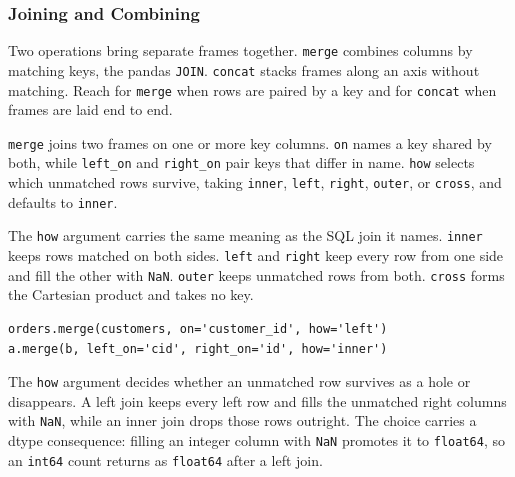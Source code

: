 \subsubsection{Joining and Combining}

Two operations bring separate frames together. \texttt{merge} combines columns by matching keys, the pandas \texttt{JOIN}. \texttt{concat} stacks frames along an axis without matching. Reach for \texttt{merge} when rows are paired by a key and for \texttt{concat} when frames are laid end to end.

\vspace{1ex}

\begin{definition}[merge]
\texttt{merge} joins two frames on one or more key columns. \texttt{on} names a key shared by both, while \texttt{left\_on} and \texttt{right\_on} pair keys that differ in name. \texttt{how} selects which unmatched rows survive, taking \texttt{inner}, \texttt{left}, \texttt{right}, \texttt{outer}, or \texttt{cross}, and defaults to \texttt{inner}.
\end{definition}

The \texttt{how} argument carries the same meaning as the SQL join it names. \texttt{inner} keeps rows matched on both sides. \texttt{left} and \texttt{right} keep every row from one side and fill the other with \texttt{NaN}. \texttt{outer} keeps unmatched rows from both. \texttt{cross} forms the Cartesian product and takes no key.

\begin{lstlisting}[style=python, caption={A keyed merge and a rename-free key pairing}]
orders.merge(customers, on='customer_id', how='left')
a.merge(b, left_on='cid', right_on='id', how='inner')
\end{lstlisting}

\begin{keybox}
The \texttt{how} argument decides whether an unmatched row survives as a hole or disappears. A left join keeps every left row and fills the unmatched right columns with \texttt{NaN}, while an inner join drops those rows outright. The choice carries a dtype consequence: filling an integer column with \texttt{NaN} promotes it to \texttt{float64}, so an \texttt{int64} count returns as \texttt{float64} after a left join.
\end{keybox}

